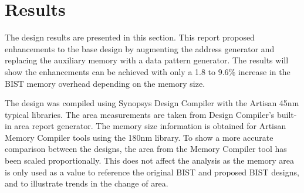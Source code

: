 \chapter{Results}
\label{chap:results}
The design results are presented in this section.  This report proposed enhancements to the base design \cite{1584083} by augmenting the address generator and replacing the auxiliary memory with a data pattern generator.  The results will show the enhancements can be achieved with only a 1.8 to 9.6\% increase in the BIST memory overhead depending on the memory size.

The design was compiled using Synopsys Design Compiler with the Artisan 45nm typical libraries.  The area measurements are taken from Design Compiler's built-in area report generator.  The memory size information is obtained for Artisan Memory Compiler tools using the 180nm library.  To show a more accurate comparison between the designs, the area from the Memory Compiler tool has been scaled proportionally.  This does not affect the analysis as the memory area is only used as a value to reference the original BIST and proposed BIST designs, and to illustrate trends in the change of area.




